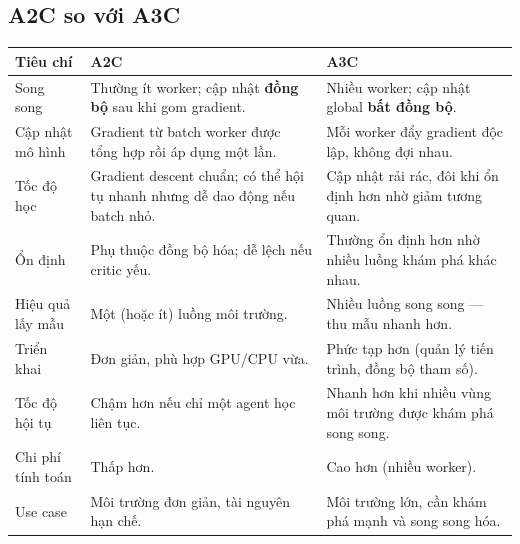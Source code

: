 \subsection{A2C so với A3C}

\begin{vidu}[title={Bảng so sánh A2C và A3C}]
\begin{tabularx}{\linewidth}{>{\raggedright\arraybackslash}p{3.6cm}XX}
\textbf{Tiêu chí} & \textbf{A2C} & \textbf{A3C} \\
\midrule
Song song &
Thường ít worker; cập nhật \textbf{đồng bộ} sau khi gom gradient. &
Nhiều worker; cập nhật global \textbf{bất đồng bộ}. \\
Cập nhật mô hình &
Gradient từ batch worker được tổng hợp rồi áp dụng một lần. &
Mỗi worker đẩy gradient độc lập, không đợi nhau. \\
Tốc độ học &
Gradient descent chuẩn; có thể hội tụ nhanh nhưng dễ dao động nếu batch nhỏ. &
Cập nhật rải rác, đôi khi ổn định hơn nhờ giảm tương quan. \\
Ổn định &
Phụ thuộc đồng bộ hóa; dễ lệch nếu critic yếu. &
Thường ổn định hơn nhờ nhiều luồng khám phá khác nhau. \\
Hiệu quả lấy mẫu &
Một (hoặc ít) luồng môi trường. &
Nhiều luồng song song --- thu mẫu nhanh hơn. \\
Triển khai &
Đơn giản, phù hợp GPU/CPU vừa. &
Phức tạp hơn (quản lý tiến trình, đồng bộ tham số). \\
Tốc độ hội tụ &
Chậm hơn nếu chỉ một agent học liên tục. &
Nhanh hơn khi nhiều vùng môi trường được khám phá song song. \\
Chi phí tính toán &
Thấp hơn. &
Cao hơn (nhiều worker). \\
Use case &
Môi trường đơn giản, tài nguyên hạn chế. &
Môi trường lớn, cần khám phá mạnh và song song hóa. \\
\end{tabularx}
\end{vidu}

